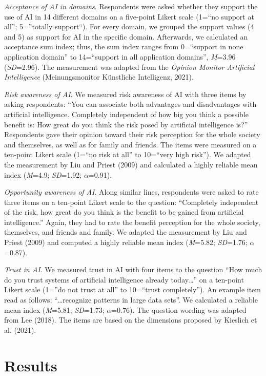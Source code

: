 \documentclass{article}
\begin{document}
\emph{Acceptance of AI in domains}. Respondents were asked whether they
support the use of AI in 14 different domains on a five-point Likert
scale (1=``no support at all''; 5=''totally support``). For every
domain, we grouped the support values (4 and 5) as support for AI in the
specific domain. Afterwards, we calculated an acceptance sum index;
thus, the sum index ranges from 0=``support in none application domain''
to 14=``support in all application domains'', \emph{M}=3.96
(\emph{SD}=2.96). The measurement was adapted from the \emph{Opinion
Monitor Artificial Intelligence} (Meinungsmonitor Künstliche
Intelligenz, 2021).

\emph{Risk awareness of AI}. We measured risk awareness of AI with three
items by asking respondents: ``You can associate both advantages and
disadvantages with artificial intelligence. Completely independent of
how big you think a possible benefit is: How great do you think the risk
posed by artificial intelligence is?'' Respondents gave their opinion
toward their risk perception for the whole society and themselves, as
well as for family and friends. The items were measured on a ten-point
Likert scale (1=``no risk at all'' to 10=``very high risk''). We adapted
the measurement by Liu and Priest (2009) and calculated a highly
reliable mean index (\emph{M}=4.9; \emph{SD}=1.92; \(\alpha\)=0.91).

\emph{Opportunity awareness of AI}. Along similar lines, respondents
were asked to rate three items on a ten-point Likert scale to the
question: ``Completely independent of the risk, how great do you think
is the benefit to be gained from artificial intelligence.'' Again, they
had to rate the benefit perception for the whole society, themselves,
and friends and family. We adapted the measurement by Liu and Priest
(2009) and computed a highly reliable mean index (\emph{M}=5.82;
\emph{SD}=1.76; \(\alpha\)=0.87).

\emph{Trust in AI}. We measured trust in AI with four items to the
question ``How much do you trust systems of artificial intelligence
already today\ldots{}'' on a ten-point Likert scale (1=''do not trust at
all'' to 10=``trust completely''). An example item read as follows:
``\ldots recognize patterns in large data sets''. We calculated a
reliable mean index (\emph{M}=5.81; \emph{SD}=1.73; \(\alpha\)=0.76).
The question wording was adapted from Lee (2018). The items are based on
the dimensions proposed by Kieslich et al. (2021).

\hypertarget{results}{%
\section{Results}\label{results}}
\end{document}
